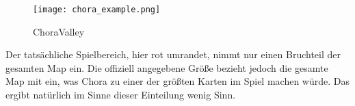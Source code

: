 \begin{figure}[htbp]
    \centering
    \texttt{[image: chora\_example.png]}
    \caption{ChoraValley}
\end{figure}
Der tatsächliche Spielbereich, hier rot umrandet, nimmt nur einen Bruchteil der gesamten Map ein.\newline
Die offiziell angegebene Größe bezieht jedoch die gesamte Map mit ein, was Chora zu einer der größten Karten im Spiel machen würde.
Das ergibt natürlich im Sinne dieser Einteilung wenig Sinn.